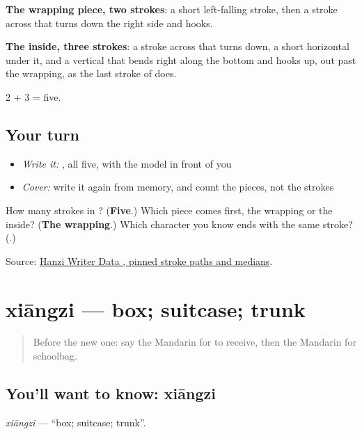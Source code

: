 \begin{quote}
\end{quote}

\textbf{The wrapping piece, two strokes}: a short left-falling stroke, then a stroke across that turns down the right side and hooks.

\textbf{The inside, three strokes}: a stroke across that turns down, a short horizontal under it, and a vertical that bends right along the bottom and hooks up, out past the wrapping, as the last stroke of  does.

2 + 3 = five.

\subsection*{Your turn}
\begin{itemize}
\raggedright
  \item \emph{Write it:} , all five, with the model in front of you
  \item \emph{Cover:} write it again from memory, and count the pieces, not the strokes
\end{itemize}

\begin{tcolorbox}[breakable,colback=teal!4,colframe=teal!35!black,title={Before you move on}]
How many strokes in ? (\textbf{Five}.) Which piece comes first, the wrapping or the inside? (\textbf{The wrapping}.) Which character you know ends with the same stroke? (\textbf{}.)

Source: \href{https://raw.githubusercontent.com/chanind/hanzi-writer-data/68d10a4b21150cae5e1ebbd223eed289cf32d90c/data/\%E5\%8C\%85.json}{Hanzi Writer Data , pinned stroke paths and medians}.
\end{tcolorbox}
\section[xiāngzi]{xiāngzi — box; suitcase; trunk}

\label{lesson:ZH-C119-xiangzi}



\begin{quote}
Before the new one: say the Mandarin for to receive, then the Mandarin for schoolbag.
\end{quote}

\subsection*{You'll want to know: xiāngzi}
\emph{xiāngzi} — \textquotedblleft{}box; suitcase; trunk\textquotedblright{}.

